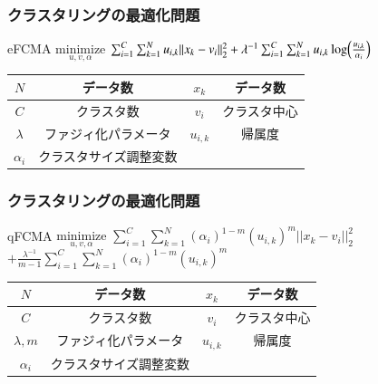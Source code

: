 \documentclass[13pt,dvipdfmx]{beamer}
\begin{document}
\begin{frame}\frametitle{クラスタリングの最適化問題}
  \begin{block}{eFCMA}
  \quad$\underset{u,v,\alpha}{\text{minimize}}$
    $\sum_{i=1}^C\sum_{k=1}^Nu_{i,k}||x_k-v_i||_2^2+\lambda^{-1}\sum_{i=1}^C\sum_{k=1}^Nu_{i,k}\log\Bigl(\frac{u_{i,k}}{\alpha_{i}}\Bigl)$
  \end{block}
  \begin{center}
\begin{tabular}{c||c|c||c} \hline
	{$N$}&データ数&{$x_k$}&データ数 \\ \hline
	{$C$}&クラスタ数&{$v_i$}&クラスタ中心\\ \hline
	{$\lambda$}&ファジィ化パラメータ&{$u_{i,k}$}&帰属度 \\ \hline
	{$\alpha_i$}&クラスタサイズ調整変数\\ \hline
\end{tabular}
\end{center}
\end{frame}

\begin{frame}\frametitle{クラスタリングの最適化問題}
  \begin{block}{qFCMA}
    \quad$\underset{u,v,\alpha}{\text{minimize}}$
    $\sum_{i=1}^C\sum_{k=1}^N(\alpha_{i})^{1-m}(u_{i,k})^m||x_k-v_i||_2^2$\\
    \qquad\qquad\qquad\qquad$+\frac{\lambda^{-1}}{m-1}\sum_{i=1}^C\sum_{k=1}^N(\alpha_{i})^{1-m}(u_{i,k})^m$
  \end{block}
  \begin{center}
\begin{tabular}{c||c|c||c} \hline
	{$N$}&データ数&{$x_k$}&データ数 \\ \hline
	{$C$}&クラスタ数&{$v_i$}&クラスタ中心\\ \hline
	{$\lambda,m$}&ファジィ化パラメータ&{$u_{i,k}$}&帰属度 \\ \hline
	{$\alpha_i$}&クラスタサイズ調整変数\\ \hline
\end{tabular}
\end{center}
\end{frame}
\end{document}
